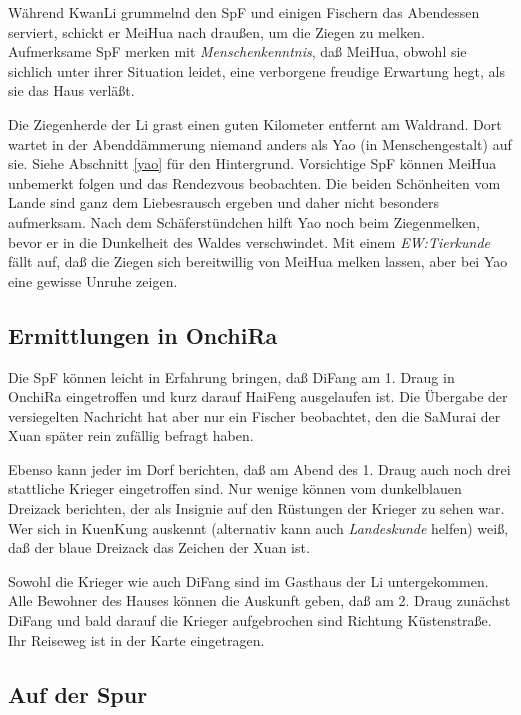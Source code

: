 \documentclass[
a4paper,
twoside,
DIV=calc,
BCOR=4mm,
fontsize=9pt,
twocolumn=on,
titlepage=on,
parskip=half
]{scrartcl}
\begin{document}
Während KwanLi grummelnd den SpF und einigen Fischern das Abendessen
serviert, schickt er MeiHua nach draußen, um die Ziegen zu
melken. Aufmerksame SpF merken mit \emph{Menschenkenntnis}, daß
MeiHua, obwohl sie sichlich unter ihrer Situation leidet, eine
verborgene freudige Erwartung hegt, als sie das Haus verläßt.

Die Ziegenherde der Li grast einen guten Kilometer entfernt am
Waldrand. Dort wartet in der Abenddämmerung niemand anders als Yao (in
Menschengestalt) auf sie. Siehe Abschnitt \ref{yao} für den
Hintergrund. Vorsichtige SpF können MeiHua unbemerkt folgen und das
Rendezvous beobachten. Die beiden Schönheiten vom Lande sind ganz dem
Liebesrausch ergeben und daher nicht besonders aufmerksam. Nach dem
Schäferstündchen hilft Yao noch beim Ziegenmelken, bevor er in die
Dunkelheit des Waldes verschwindet. Mit einem \emph{EW:Tierkunde}
fällt auf, daß die Ziegen sich bereitwillig von MeiHua melken
lassen, aber bei Yao eine gewisse Unruhe zeigen.

\subsection{Ermittlungen in OnchiRa}

Die SpF können leicht in Erfahrung bringen, daß DiFang am 1. Draug in
OnchiRa eingetroffen und kurz darauf HaiFeng ausgelaufen ist. Die
Übergabe der versiegelten Nachricht hat aber nur ein Fischer
beobachtet, den die SaMurai der Xuan später rein zufällig befragt
haben.

Ebenso kann jeder im Dorf berichten, daß am Abend des 1. Draug auch
noch drei stattliche Krieger eingetroffen sind. Nur wenige können vom
dunkelblauen Dreizack berichten, der als Insignie auf den Rüstungen
der Krieger zu sehen war. Wer sich in KuenKung auskennt (alternativ
kann auch \emph{Landeskunde} helfen) weiß, daß der blaue Dreizack das
Zeichen der Xuan ist.

Sowohl die Krieger wie auch DiFang sind im Gasthaus der Li
untergekommen. Alle Bewohner des Hauses können die Auskunft geben, daß
am 2. Draug zunächst DiFang und bald darauf die Krieger aufgebrochen
sind Richtung Küstenstraße. Ihr Reiseweg ist in der Karte eingetragen.

\subsection{Auf der Spur}
\end{document}
